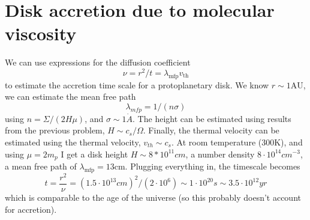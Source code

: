 \documentclass[11pt]{article}
\begin{document}
\section{Disk accretion due to molecular viscosity}
\label{sec:orgf5ec5d1}
We can use expressions for the diffusion coefficient
\begin{equation}
 \nu = r^2 / t = \lambda_{\text{mfp}} v_{\text{th}}
\end{equation}
to estimate the accretion time scale for a protoplanetary disk.
We know \(r \sim 1 \text{AU}\), we can estimate the mean free path
\begin{equation}
 \lambda_{mfp} = 1/\left(n \sigma  \right)
\end{equation}
using \(n = \Sigma/\left(2 H \mu \right)\), and \(\sigma \sim 1 \dot{A}\).
The height can be estimated using results from the previous problem, \(H \sim c_s / \Omega\).
Finally, the thermal velocity can be estimated using the thermal velocity, \(v_{th} \sim c_s\).
At room temperature (300K), and using \(\mu = 2 m_p\) I get a disk height \(H \sim 8 * 10^{11} cm\), a number density \(8 \cdot 10^{14} cm^{-3}\), a mean free path of \(\lambda_{\text{mfp}}=13 \text{cm}\).
Plugging everything in, the timescale becomes
\begin{equation}
 t = \frac{r^2}{\nu} = (1.5 \cdot 10^{13} cm)^2 / (2 \cdot 10^6) \sim 1 \cdot 10^{20} s \sim  3.5 \cdot 10^{12} yr
\end{equation}
which is comparable to the age of the universe (so this probably doesn't account for accretion).
\end{document}
